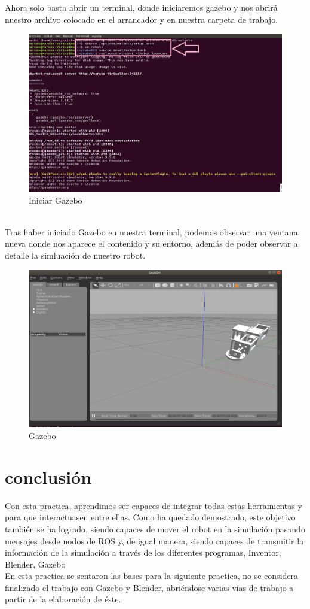 \documentclass[11pt,a4paper,oldfontcommands,oneside]{memoir}
\begin{document}
Ahora solo basta abrir un terminal, donde iniciaremos gazebo y nos abrirá nuestro archivo colocado en el arrancador y en nuestra carpeta de trabajo.
\begin{figure}[h]
	\includegraphics[scale=.75]{iniciargaz.png}
	\caption{Iniciar Gazebo}
	\label{Imagen 8}
\end{figure}\\
Tras haber iniciado Gazebo en nuestra terminal, podemos observar una ventana nueva donde nos aparece el contenido y su entorno, además de poder observar a detalle la simluación de nuestro robot.
\begin{figure}[h]
	\includegraphics[scale=.75]{gaz.png}
	\caption{Gazebo}
	\label{Imagen 9}
\end{figure}
\chapter{conclusión}
Con esta practica, aprendimos ser capaces de integrar todas estas herramientas y para que
interactuasen entre ellas. Como ha quedado demostrado, este objetivo también se ha
logrado, siendo capaces de mover el robot en la simulación pasando mensajes desde
nodos de ROS y, de igual manera, siendo capaces de transmitir la información de la
simulación a través de los diferentes programas, Inventor, Blender, Gazebo\\
En esta practica se sentaron las bases para la siguiente practica, no se considera finalizado el trabajo con Gazebo y Blender, abriéndose varias vías de trabajo a partir de la elaboración de éste. \\


\cite{joseph2018kick}
\cite{de2006robotica}
\hfill


\end{document}
